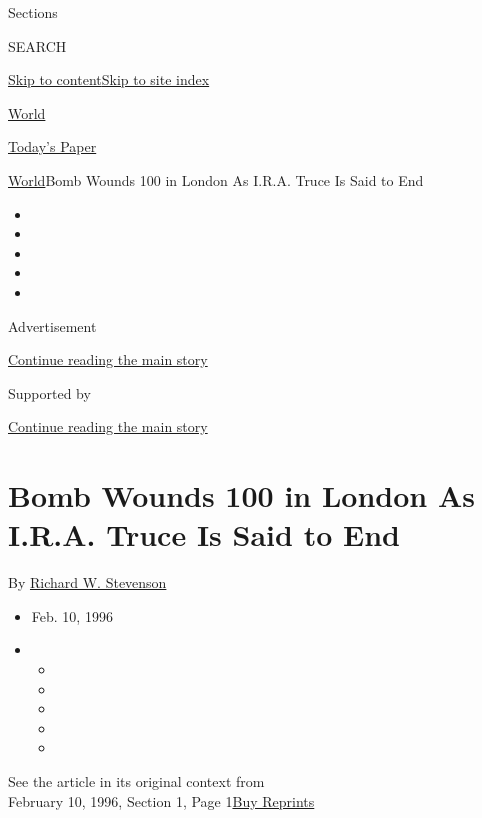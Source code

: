 Sections

SEARCH

\protect\hyperlink{site-content}{Skip to
content}\protect\hyperlink{site-index}{Skip to site index}

\href{https://www.nytimes.com/section/world}{World}

\href{https://myaccount.nytimes.com/auth/login?response_type=cookie\&client_id=vi}{}

\href{https://www.nytimes.com/section/todayspaper}{Today's Paper}

\href{/section/world}{World}\textbar{}Bomb Wounds 100 in London As
I.R.A. Truce Is Said to End

\begin{itemize}
\item
\item
\item
\item
\item
\end{itemize}

Advertisement

\protect\hyperlink{after-top}{Continue reading the main story}

Supported by

\protect\hyperlink{after-sponsor}{Continue reading the main story}

\hypertarget{bomb-wounds-100-in-london-as-ira-truce-is-said-to-end}{%
\section{Bomb Wounds 100 in London As I.R.A. Truce Is Said to
End}\label{bomb-wounds-100-in-london-as-ira-truce-is-said-to-end}}

By \href{https://www.nytimes.com/by/richard-w-stevenson}{Richard W.
Stevenson}

\begin{itemize}
\item
  Feb. 10, 1996
\item
  \begin{itemize}
  \item
  \item
  \item
  \item
  \item
  \end{itemize}
\end{itemize}

See the article in its original context from\\
February 10, 1996, Section 1, Page
1\href{https://store.nytimes.com/collections/new-york-times-page-reprints?utm_source=nytimes\&utm_medium=article-page\&utm_campaign=reprints}{Buy
Reprints}

